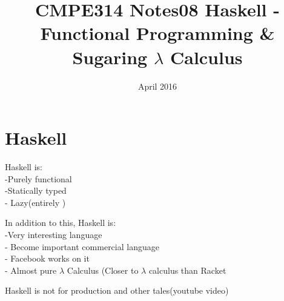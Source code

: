 \documentclass{article}
\title{CMPE314 Notes08 Haskell - Functional Programming \& Sugaring $\lambda$ Calculus}
\date{April 2016}
\begin{document}
\maketitle


\section{Haskell}
\begin{flushleft}
Haskell is: \\-Purely functional\\ -Statically typed \\ - Lazy(entirely )\\
\end{flushleft}


\begin{flushleft}
 In addition to this, Haskell is:\\ -Very interesting language \\ - Become important commercial language \\ - Facebook works on it \\ - Almost pure  $\lambda$ Calculus (Closer to  $\lambda$ calculus than Racket
\end{flushleft}


\vspace{2mm}

\begin{flushleft} Haskell is not for production and other tales(youtube video)\\
\usepackage{https://www.youtube.com/watch?v=mlTO510zO78} \\
\end{flushleft}


\doublespacing
\end{document}
